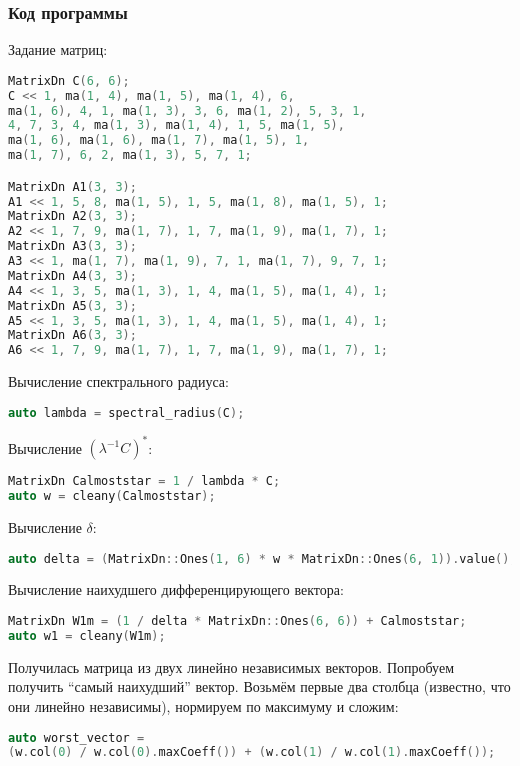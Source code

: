 \documentclass[specialist,
  substylefile = spbu.rtx,
  href,
  colorlinks=true,
  12pt]{disser}
\begin{document}
\subsubsection{Код программы}

Задание матриц:
\begin{lstlisting}[language=c++,basicstyle=\small\ttfamily,keywordstyle=\color{red}]
MatrixDn C(6, 6);
C << 1, ma(1, 4), ma(1, 5), ma(1, 4), 6,
ma(1, 6), 4, 1, ma(1, 3), 3, 6, ma(1, 2), 5, 3, 1,
4, 7, 3, 4, ma(1, 3), ma(1, 4), 1, 5, ma(1, 5),
ma(1, 6), ma(1, 6), ma(1, 7), ma(1, 5), 1,
ma(1, 7), 6, 2, ma(1, 3), 5, 7, 1;

MatrixDn A1(3, 3);
A1 << 1, 5, 8, ma(1, 5), 1, 5, ma(1, 8), ma(1, 5), 1;
MatrixDn A2(3, 3);
A2 << 1, 7, 9, ma(1, 7), 1, 7, ma(1, 9), ma(1, 7), 1;
MatrixDn A3(3, 3);
A3 << 1, ma(1, 7), ma(1, 9), 7, 1, ma(1, 7), 9, 7, 1;
MatrixDn A4(3, 3);
A4 << 1, 3, 5, ma(1, 3), 1, 4, ma(1, 5), ma(1, 4), 1;
MatrixDn A5(3, 3);
A5 << 1, 3, 5, ma(1, 3), 1, 4, ma(1, 5), ma(1, 4), 1;
MatrixDn A6(3, 3);
A6 << 1, 7, 9, ma(1, 7), 1, 7, ma(1, 9), ma(1, 7), 1;
\end{lstlisting}

Вычисление спектрального радиуса:
\begin{lstlisting}[language=c++,basicstyle=\footnotesize\ttfamily]
auto lambda = spectral_radius(C);
\end{lstlisting}

Вычисление $(\lambda^{-1}C)^*$:
\begin{lstlisting}[language=c++,basicstyle=\footnotesize\ttfamily]
MatrixDn Calmoststar = 1 / lambda * C;
auto w = cleany(Calmoststar);
\end{lstlisting}


Вычисление $\delta$:
\begin{lstlisting}[language=c++,basicstyle=\footnotesize\ttfamily]
auto delta = (MatrixDn::Ones(1, 6) * w * MatrixDn::Ones(6, 1)).value();
\end{lstlisting}

Вычисление наихудшего дифференцирующего вектора:
\begin{lstlisting}[language=c++,basicstyle=\footnotesize\ttfamily]
MatrixDn W1m = (1 / delta * MatrixDn::Ones(6, 6)) + Calmoststar;
auto w1 = cleany(W1m);
\end{lstlisting}

Получилась матрица из двух линейно независимых векторов. Попробуем получить \enquote{самый наихудший} вектор. Возьмём первые два столбца (известно, что они линейно независимы), нормируем по максимуму и сложим:
\begin{lstlisting}[language=c++,basicstyle=\footnotesize\ttfamily]
auto worst_vector =
(w.col(0) / w.col(0).maxCoeff()) + (w.col(1) / w.col(1).maxCoeff());
\end{lstlisting}
\end{document}
